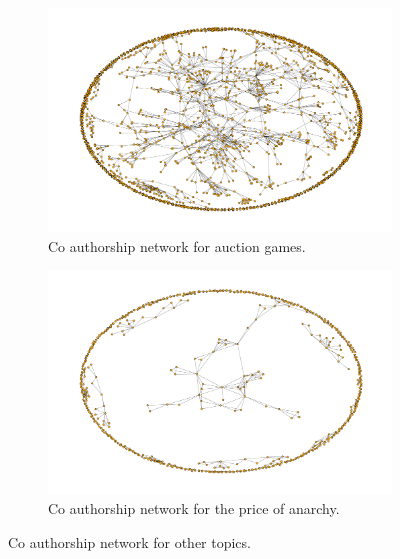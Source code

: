 \documentclass{article}
\theoremstyle{definition}
\begin{document}
\begin{center}
    \begin{figure}[!hbtp]
        \begin{subfigure}{0.5\textwidth}
            \includegraphics[width=\textwidth]{./assets/images/co-authors-network-auction.pdf}
            \caption{Co authorship network for auction games.}
        \end{subfigure}
        \begin{subfigure}{0.5\textwidth}
            \includegraphics[width=\textwidth]{./assets/images/co-authors-network-price.pdf}
            \caption{Co authorship network for the price of anarchy.}
        \end{subfigure}
    \caption{Co authorship network for other topics.}
    \label{fig:co-authorship-other-topics}
    \end{figure}
    \end{center}
\end{document}
